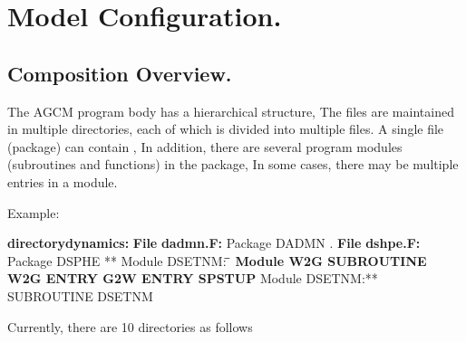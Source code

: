 \hypertarget{model-configuration.}{%
\section{Model Configuration.}\label{model-configuration.}}

\hypertarget{composition-overview.}{%
\subsection{Composition Overview.}\label{composition-overview.}}

The AGCM program body has a hierarchical structure, The files are
maintained in multiple directories, each of which is divided into
multiple files. A single file (package) can contain , In addition, there
are several program modules (subroutines and functions) in the package,
In some cases, there may be multiple entries in a module.

Example:

{\textbf{directory}}\textbf{dynamics: } {\textbf{File}} \textbf{dadmn.F:
} \blanket* Package DADMN . {\textbf{File}} \textbf{dshpe.F: }
\blanket* Package DSPHE ** Module DSETNM: \textbf{̄ {\textbf{Module
W2G}} SUBROUTINE W2G ENTRY G2W ENTRY SPSTUP } Module DSETNM:**
SUBROUTINE DSETNM

Currently, there are 10 directories as follows

